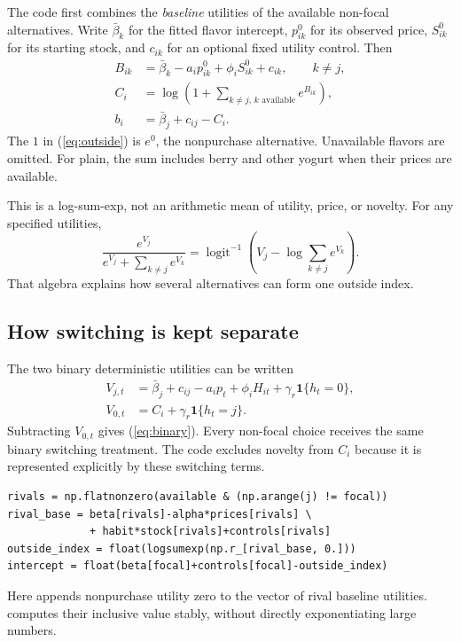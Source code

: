 \documentclass[11pt]{article}
\newcommand{\sig}{\operatorname{logit}^{-1}}
\newcommand{\ind}{\mathbf{1}}
\newcommand{\code}[1]{\texttt{\detokenize{#1}}}
\begin{document}
The code first combines the \emph{baseline} utilities of the available non-focal alternatives. Write $\bar\beta_k$ for the fitted flavor intercept, $p^0_{ik}$ for its observed price, $S^0_{ik}$ for its starting stock, and $c_{ik}$ for an optional fixed utility control. Then
\begin{align}
 B_{ik}&=\bar\beta_k-a_i p^0_{ik}+\phi_i S^0_{ik}+c_{ik},\qquad k\ne j,\\
 C_i&=\log\left(1+\sum_{k\ne j,\,k\text{ available}} e^{B_{ik}}\right),\label{eq:outside}\\
 b_i&=\bar\beta_j+c_{ij}-C_i.\label{eq:b}
\end{align}
The $1$ in (\ref{eq:outside}) is $e^0$, the nonpurchase alternative. Unavailable flavors are omitted. For plain, the sum includes berry and other yogurt when their prices are available.

This is a log-sum-exp, not an arithmetic mean of utility, price, or novelty. For any specified utilities,
\[
 \frac{e^{V_j}}{e^{V_j}+\sum_{k\ne j}e^{V_k}}
 =\sig\left(V_j-\log\sum_{k\ne j}e^{V_k}\right).
\]
That algebra explains how several alternatives can form one outside index.

\subsection{How switching is kept separate}
The two binary deterministic utilities can be written
\begin{align}
 V_{j,t}&=\bar\beta_j+c_{ij}-a_i p_t+\phi_i H_{it}+\gamma_r\ind\{h_t=0\},\\
 V_{0,t}&=C_i+\gamma_r\ind\{h_t=j\}.
\end{align}
Subtracting $V_{0,t}$ gives (\ref{eq:binary}). Every non-focal choice receives the same binary switching treatment. The code excludes novelty from $C_i$ because it is represented explicitly by these switching terms.

\begin{lstlisting}
rivals = np.flatnonzero(available & (np.arange(j) != focal))
rival_base = beta[rivals]-alpha*prices[rivals] \
             + habit*stock[rivals]+controls[rivals]
outside_index = float(logsumexp(np.r_[rival_base, 0.]))
intercept = float(beta[focal]+controls[focal]-outside_index)
\end{lstlisting}
Here \code{np.r_[rival_base, 0.]} appends nonpurchase utility zero to the vector of rival baseline utilities. \code{logsumexp} computes their inclusive value stably, without directly exponentiating large numbers.
\end{document}
